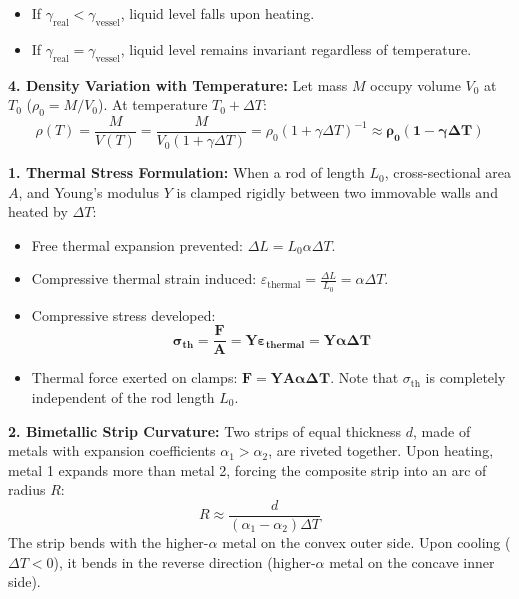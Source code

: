 \documentclass[10pt,a4paper]{article}
\begin{document}
\begin{formulabox}
\begin{itemize}
  \item If $\gamma_{\text{real}} < \gamma_{\text{vessel}}$, liquid level falls upon heating.
  \item If $\gamma_{\text{real}} = \gamma_{\text{vessel}}$, liquid level remains invariant regardless of temperature.
\end{itemize}
\textbf{4. Density Variation with Temperature:}
Let mass $M$ occupy volume $V_0$ at $T_0$ ($\rho_0 = M/V_0$). At temperature $T_0 + \Delta T$:
\begin{equation}
  \rho(T) = \frac{M}{V(T)} = \frac{M}{V_0(1 + \gamma\Delta T)} = \rho_0(1 + \gamma\Delta T)^{-1} \approx \mathbf{\rho_0(1 - \gamma\Delta T)}
\end{equation}
\end{formulabox}

\begin{usecasebox}
\textbf{1. Thermal Stress Formulation:}
When a rod of length $L_0$, cross-sectional area $A$, and Young's modulus $Y$ is clamped rigidly between two immovable walls and heated by $\Delta T$:
\begin{itemize}
  \item Free thermal expansion prevented: $\Delta L = L_0 \alpha \Delta T$.
  \item Compressive thermal strain induced: $\varepsilon_{\text{thermal}} = \frac{\Delta L}{L_0} = \alpha \Delta T$.
  \item Compressive stress developed:
  \begin{equation}
    \mathbf{\sigma_{\text{th}} = \frac{F}{A} = Y \varepsilon_{\text{thermal}} = Y \alpha \Delta T}
  \end{equation}
  \item Thermal force exerted on clamps: $\mathbf{F = Y A \alpha \Delta T}$. Note that $\sigma_{\text{th}}$ is completely independent of the rod length $L_0$.
\end{itemize}
\textbf{2. Bimetallic Strip Curvature:}
Two strips of equal thickness $d$, made of metals with expansion coefficients $\alpha_1 > \alpha_2$, are riveted together. Upon heating, metal 1 expands more than metal 2, forcing the composite strip into an arc of radius $R$:
\begin{equation}
  R \approx \frac{d}{(\alpha_1 - \alpha_2)\Delta T}
\end{equation}
The strip bends with the higher-$\alpha$ metal on the convex outer side. Upon cooling ($\Delta T < 0$), it bends in the reverse direction (higher-$\alpha$ metal on the concave inner side).
\end{usecasebox}
\end{document}
